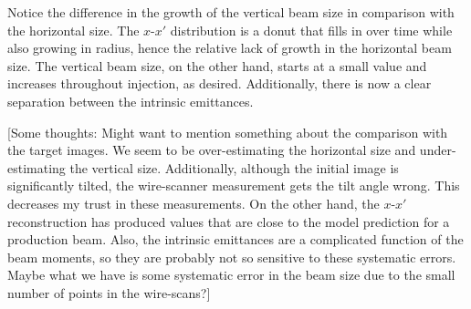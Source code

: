 %
Notice the difference in the growth of the vertical beam size in comparison with the horizontal size. The $x$-$x'$ distribution is a donut that fills in over time while also growing in radius, hence the relative lack of growth in the horizontal beam size. The vertical beam size, on the other hand, starts at a small value and increases throughout injection, as desired. Additionally, there is now a clear separation between the intrinsic emittances.

[Some thoughts: Might want to mention something about the comparison with the target images. We seem to be over-estimating the horizontal size and under-estimating the vertical size. Additionally, although the initial image is significantly tilted, the wire-scanner measurement gets the tilt angle wrong. This decreases my trust in these measurements. On the other hand, the $x$-$x'$ reconstruction has produced values that are close to the model prediction for a production beam. Also, the intrinsic emittances are a complicated function of the beam moments, so they are probably not so sensitive to these systematic errors. Maybe what we have is some systematic error in the beam size due to the small number of points in the wire-scans?]

